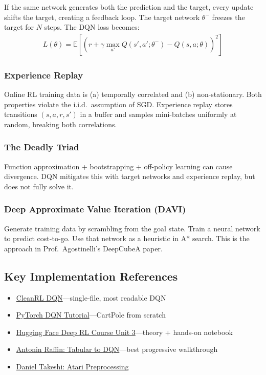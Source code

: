 \documentclass[11pt,letterpaper]{article}
\begin{document}
If the same network generates both the prediction and the target, every update shifts the target, creating a feedback loop. The target network $\theta^{-}$ freezes the target for $N$ steps. The DQN loss becomes:
\begin{align}
    L(\theta) = \mathbb{E}\left[\left(r + \gamma \max_{a'} Q(s', a'; \theta^{-}) - Q(s, a; \theta)\right)^2\right]
\end{align}

\subsubsection{Experience Replay}

Online RL training data is (a) temporally correlated and (b) non-stationary. Both properties violate the i.i.d.\ assumption of SGD. Experience replay stores transitions $(s, a, r, s')$ in a buffer and samples mini-batches uniformly at random, breaking both correlations.

\subsubsection{The Deadly Triad}

Function approximation + bootstrapping + off-policy learning can cause divergence. DQN mitigates this with target networks and experience replay, but does not fully solve it.

\subsubsection{Deep Approximate Value Iteration (DAVI)}

Generate training data by scrambling from the goal state. Train a neural network to predict cost-to-go. Use that network as a heuristic in A* search. This is the approach in Prof.\ Agostinelli's DeepCubeA paper.

\subsection{Key Implementation References}

\begin{itemize}[nosep]
    \item \href{https://github.com/vwxyzjn/cleanrl/blob/master/cleanrl/dqn.py}{CleanRL DQN}---single-file, most readable DQN
    \item \href{https://docs.pytorch.org/tutorials/intermediate/reinforcement_q_learning.html}{PyTorch DQN Tutorial}---CartPole from scratch
    \item \href{https://huggingface.co/learn/deep-rl-course/en/unit3/introduction}{Hugging Face Deep RL Course Unit 3}---theory + hands-on notebook
    \item \href{https://araffin.github.io/post/rl102/}{Antonin Raffin: Tabular to DQN}---best progressive walkthrough
    \item \href{https://danieltakeshi.github.io/2016/11/25/frame-skipping-and-preprocessing-for-deep-q-networks-on-atari-2600-games/}{Daniel Takeshi: Atari Preprocessing}
\end{itemize}
\end{document}
